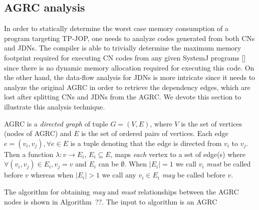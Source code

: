
\subsection{AGRC analysis}
\label{sec:agrc-analysis}

In order to statically determine the worst case memory consumption of a
program targeting TP-JOP, one needs to analyze codes generated from both
CNs and JDNs. The compiler is able to trivially determine the maximum
memory footprint required for executing CN codes from any given SystemJ
programs [] since there is no dynamic memory allocation required for
executing this code. On the other hand, the data-flow analysis for JDNs
is more intricate since it needs to analyze the original AGRC in order
to retrieve the dependency edges, which are lost after splitting CNs and
JDNs from the AGRC. We devote this section to illustrate this analysis
technique.

AGRC is a \textit{directed graph} of tuple $G =(V,E)$, where $V$ is the
set of vertices (nodes of AGRC) and $E$ is the set of ordered pairs of
vertices. Each edge $e = (v_i,v_j), \forall e \in E$ is a tuple denoting
that the edge is directed from $v_i$ to $v_j$. Then a function
$\lambda:v \rightarrow E_i$, $E_i \subseteq E$, maps \textit{each}
vertex to a set of edge(s) where $\forall (v_i,v_j) \in E_i, v_j = v$
and $E_i$ can be $\emptyset$. When $|E_i| = 1$ we call $v_i$
\textit{must} be called before $v$ whereas when $|E_i| > 1$ we call any
$v_i \in E_i$ \textit{may} be called before $v$.

The algorithm for obtaining \textit{may} and \textit{must} relationships
between the AGRC nodes is shown in Algorithm~??. The input to algorithm
is an AGRC  

